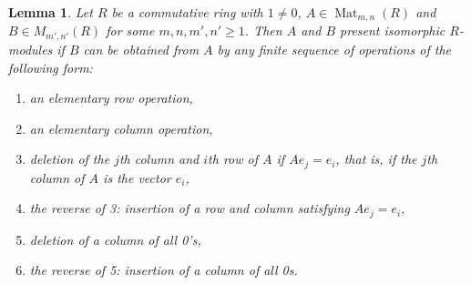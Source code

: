 \documentclass[12pt]{report}
\newtheorem{lemma}[theorem]{Lemma}
\numberwithin{equation}{section}
\numberwithin{theorem}{chapter}
\theoremstyle{definition}
\newtheorem*{basic properties}{Basic Properties}
\newtheorem*{Important Remark}{Important Remark}
\DeclareMathOperator{\M}{Mat}
\begin{document}
\begin{lemma} 
Let $R$ be a commutative ring with $1 \neq 0$, $A \in \M_{m,n}(R)$ and $B \in M_{m',n'}(R)$ for some $m,n,m',n' \geqslant 1$. Then $A$ and $B$ present isomorphic $R$-modules if $B$ can be obtained from $A$ by any finite sequence of operations of the following form: 
\begin{enumerate}[label=(\arabic*),leftmargin=20pt]
\item an elementary row operation, 
\item an elementary column operation,
\item deletion of the $j$th column and $i$th row of $A$ if $Ae_j = e_i$, that is, if the $j$th column of $A$ is the vector $e_i$, 
\item the reverse of 3: insertion of a row and column satisfying $Ae_j = e_i$, 
\item deletion of a column of all 0's, 
\item the reverse of 5: insertion of a column of all 0s.
 \end{enumerate}
 \end{lemma}
 
 
 
\end{document}
